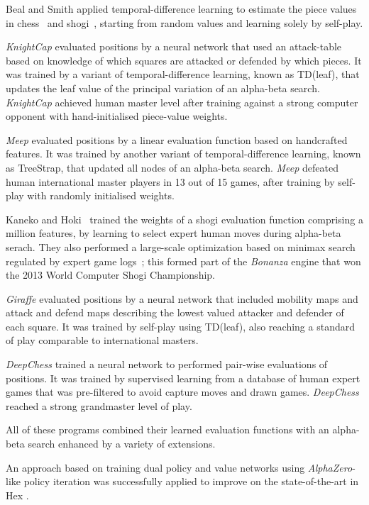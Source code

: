 \documentclass[12pt]{article}
\begin{document}
Beal and Smith applied temporal-difference learning to estimate the piece values in chess~\cite{BealSmith00} and shogi~\cite{BealSmith01}, starting from random values and learning solely by self-play.

\emph{KnightCap} \cite{baxter:knightcap} evaluated positions by a neural network that used an attack-table based on knowledge of which squares are attacked or defended by which pieces. It was trained by a variant of temporal-difference learning, known as TD(leaf), that updates the leaf value of the principal variation of an alpha-beta search. \emph{KnightCap} achieved human master level after training against a strong computer opponent with hand-initialised piece-value weights.

\emph{Meep} \cite{veness:rootstrap} evaluated positions by a linear evaluation function based on handcrafted features. It was trained by another variant of temporal-difference learning, known as TreeStrap, that updated all nodes of an alpha-beta search. \emph{Meep} defeated human international master players in 13 out of 15 games, after training by self-play with randomly initialised weights. 

Kaneko and Hoki~\cite{KanekoHoki11} trained the weights of a shogi evaluation function comprising a million features, by learning to select expert human moves during alpha-beta serach. They also performed a large-scale optimization based on minimax search regulated by expert game logs~\cite{HokiKaneko14}; this formed part of the \emph{Bonanza} engine that won the 2013 World Computer Shogi Championship.

\emph{Giraffe} \cite{lai:giraffe} evaluated positions by a neural network that included mobility maps and attack and defend maps describing the lowest valued attacker and defender of each square. It was trained by self-play using TD(leaf), also reaching a standard of play comparable to international masters. 

\emph{DeepChess} \cite{david2016deepchess} trained a neural network to performed pair-wise evaluations of positions. It was trained by supervised learning from a database of human expert games that was pre-filtered to avoid capture moves and drawn games. \emph{DeepChess} reached a strong grandmaster level of play. 

All of these programs combined their learned evaluation functions with an alpha-beta search enhanced by a variety of extensions. 

An approach based on training dual policy and value networks using \emph{AlphaZero}-like policy iteration was successfully applied to improve on the state-of-the-art in Hex \cite{anthony:hex}.
\end{document}
